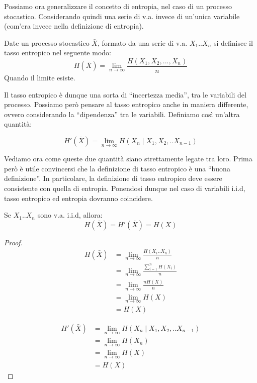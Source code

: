 Possiamo ora generalizzare il concetto di entropia, nel caso di un processo stocastico. Considerando quindi una serie di v.a. invece 
di un'unica variabile (com'era invece nella definizione di entropia).

\begin{definizione}
 Date un processo stocastico $\bar{X}$, formato da una serie di v.a. $X_1..X_n$ si definisce il tasso entropico nel seguente modo:
 \[
 H(\bar{X})=\lim_{n \to \infty} \frac{H(X_1,X_2,...,X_n)}{n}
 \]
  Quando il limite esiste.
\end{definizione}

Il tasso entropico è dunque una sorta di ``incertezza media'', tra le variabili del processo.
Possiamo però pensare al tasso entropico anche in maniera differente, ovvero considerando la ``dipendenza'' tra le variabili.
Definiamo così un'altra quantità:

\[
 H'(\bar{X})=\lim_{n \to \infty} H(X_n \mid X_1,X_2,..X_{n-1})
\]

Vediamo ora come queste due quantità siano strettamente legate tra loro. Prima però è utile convincersi che la definizione di tasso 
entropico è una ``buona definizione''. In particolare, la definizione di tasso entropico deve essere consistente con quella di entropia.
Ponendosi dunque nel caso di variabili i.i.d, tasso entropico ed entropia dovranno coincidere.

\begin{osservazione}
 Se $X_1..X_n$ sono v.a. i.i.d, allora:
 \[
   H(\bar{X})=H'(\bar{X})=H(X)
 \]
 \begin{proof}
  \[\begin{split}
   H(\bar{X})&=\lim_{n \to \infty} \frac{H(X_1..X_n)}{n} \\
   &=\lim_{n \to \infty} \frac{\sum_{i=1}^n H(X_i)}{n} \\
   &=\lim_{n \to \infty} \frac{n H(X)}{n} \\
   &=\lim_{n \to \infty} {H(X)} \\
   &=H(X)
    \end{split}
  \]

  \[\begin{split}
   H'(\bar{X})&=\lim_{n \to \infty} H(X_n \mid X_1,X_2,..X_{n-1}) \\
   &=\lim_{n \to \infty} H(X_n) \\
   &=\lim_{n \to \infty} H(X) \\
   &= H(X)
    \end{split}
  \]

 \end{proof}

\end{osservazione}

